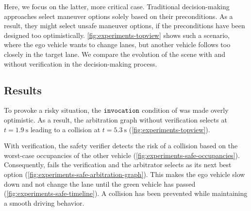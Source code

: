 Here, we focus on the latter, more critical case.
Traditional decision-making approaches select maneuver options solely based on their preconditions.
As a result, they might select unsafe maneuver options,
if the preconditions have been designed too optimistically.
%
\cref{fig:experiments-topview} shows such a scenario, where the ego vehicle wants to change lanes,
but another vehicle follows too closely in the target lane.
We compare the evolution of the scene with and without verification in the decision-making process.


\subsection{Results}



To provoke a risky situation,
the $\texttt{invocation}$ condition of  was made overly optimistic.
As a result, the arbitration graph without verification selects  at $t=\SI{1.9}{\second}$
leading to a collision at $t=\SI{5.3}{\second}$ (\cref{fig:experiments-topview}).

With verification, the safety verifier detects the risk of a collision based on the worst-case occupancies of the other vehicle (\cref{fig:experiments-safe-occupancies}).
Consequently,  fails the verification and
the  arbitrator selects 
as its next best option (\cref{fig:experiments-safe-arbitration-graph}).
This makes the ego vehicle slow down and not change the lane
until the green vehicle has passed (\cref{fig:experiments-safe-timeline}).
A collision has been prevented
while maintaining a smooth driving behavior.
